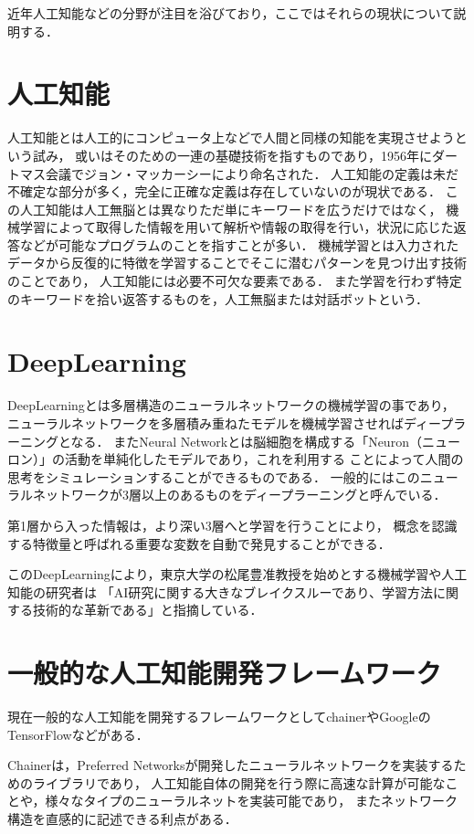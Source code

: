 近年人工知能などの分野が注目を浴びており，ここではそれらの現状について説明する．

\section{人工知能}
人工知能とは人工的にコンピュータ上などで人間と同様の知能を実現させようという試み，
或いはそのための一連の基礎技術を指すものであり，1956年にダートマス会議でジョン・マッカーシーにより命名された．
人工知能の定義は未だ不確定な部分が多く，完全に正確な定義は存在していないのが現状である．
この人工知能は人工無脳とは異なりただ単にキーワードを広うだけではなく，
機械学習によって取得した情報を用いて解析や情報の取得を行い，状況に応じた返答などが可能なプログラムのことを指すことが多い．
機械学習とは入力されたデータから反復的に特徴を学習することでそこに潜むパターンを見つけ出す技術のことであり，
人工知能には必要不可欠な要素である．
また学習を行わず特定のキーワードを拾い返答するものを，人工無脳または対話ボットという．

\section{DeepLearning}
DeepLearning\cite{deep}とは多層構造のニューラルネットワークの機械学習の事であり，
ニューラルネットワークを多層積み重ねたモデルを機械学習させればディープラーニングとなる．
またNeural Networkとは脳細胞を構成する「Neuron（ニューロン）」の活動を単純化したモデルであり，これを利用する
ことによって人間の思考をシミュレーションすることができるものである．
一般的にはこのニューラルネットワークが3層以上のあるものをディープラーニングと呼んでいる．

第1層から入った情報は，より深い3層へと学習を行うことにより，
概念を認識する特徴量と呼ばれる重要な変数を自動で発見することができる．

このDeepLearningにより，東京大学の松尾豊准教授\cite{boom}を始めとする機械学習や人工知能の研究者は
「AI研究に関する大きなブレイクスルーであり、学習方法に関する技術的な革新である」と指摘している．

\section{一般的な人工知能開発フレームワーク}\label{sec:ippan}
現在一般的な人工知能を開発するフレームワークとしてchainerやGoogleのTensorFlowなどがある．

Chainerは，Preferred Networksが開発したニューラルネットワークを実装するためのライブラリであり，
人工知能自体の開発を行う際に高速な計算が可能なことや，様々なタイプのニューラルネットを実装可能であり，
またネットワーク構造を直感的に記述できる利点がある．

